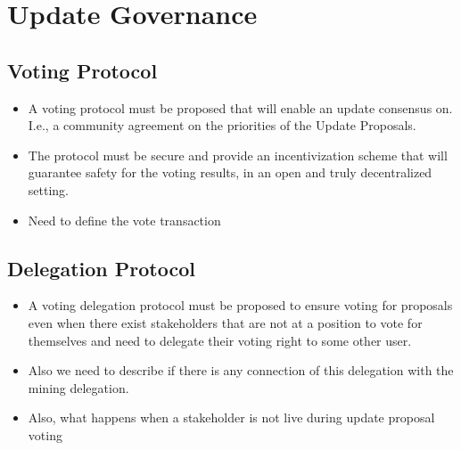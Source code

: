 \section{Update Governance}
\subsection*{Voting Protocol}
\begin{itemize}
\item A voting protocol must be proposed that will enable an update consensus on. I.e., a community agreement on the priorities of the Update Proposals. 
\item The protocol must be secure and provide an incentivization scheme that will guarantee safety for the voting results, in an open and truly decentralized setting.
\item Need to define the vote transaction
\end{itemize}

\subsection*{Delegation Protocol}
\begin{itemize}
\item A voting delegation protocol must be proposed to ensure voting for proposals even when there exist stakeholders that are not at a position to vote for themselves and need to delegate their voting right to some other user. 
\item Also we need to describe if there is any connection of this delegation with the mining delegation.
\item Also, what happens when a stakeholder is not live during update proposal voting
\end{itemize}

